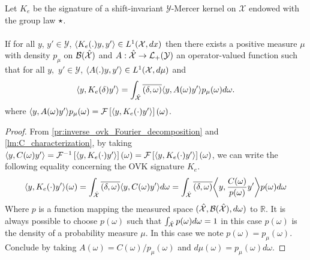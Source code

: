 \begin{proposition}
\label{pr:spectral}
Let $K_e$ be the signature of a shift-invariant $\mathcal{Y}$-Mercer kernel on $\mathcal{X}$ endowed with the group law $\star$.
\paragraph{}
If for all $y$, $y' \in\mathcal{Y}$, $\langle K_e(.)y,y'\rangle\in L^1(\mathcal{X},dx)$ then there exists a positive measure $\mu$ with density $p_{\mu}$ on $\mathcal{B}(\mathcal{\hat{\mathcal{X}}})$ and $A:\hat{\mathcal{X}}\to \mathcal{L}_+(\mathcal{Y})$ an operator-valued function such that for all $y,$ $y'\in\mathcal{Y}$, $\langle A(.)y,y'\rangle\in L^1(\mathcal{X},d\mu)$ and
\begin{dmath*}
\inner{y, K_e(\delta)y'}=\int_{\dual{\mathcal{X}}}\conj{\pairing{\delta, \omega}}\inner{y, A(\omega)y'}p_{\mu}(\omega)d\omega.
\end{dmath*}
where $\langle y, A(\omega)y'\rangle p_{\mu}(\omega) = \mathcal{F}\left[\langle y, K_e(\cdot)y'\rangle\right](\omega)$.
\end{proposition}
\begin{proof}
From \cref{pr:inverse_ovk_Fourier_decomposition} and \cref{lm:C_characterization}, by taking $\langle y,C(\omega)y'\rangle = \mathcal{F}^{-1}\left[\langle y, K_e(\cdot)y'\rangle\right](\omega)=\mathcal{F}\left[\langle y, K_e(\cdot)y'\rangle\right](\omega)$, we can write the following equality concerning the \acs{OVK} signature $K_e$. 
\begin{dmath*}
\inner{y, K_e(\cdot)y'}(\omega)=
\int_{\dual{\mathcal{X}}}\conj{\pairing{\delta, \omega}}\inner{y, C(\omega)y'}d\omega
=\int_{\dual{\mathcal{X}}}\conj{\pairing{\delta, \omega}}\inner*{y, \frac{C(\omega)}{p(\omega)}y'}p(\omega)d\omega
\end{dmath*}
Where $p$ is a function mapping the measured space $(\hat{\mathcal{X}}, \mathcal{B}(\hat{\mathcal{X}}), d\omega)$ to $\mathbb{R}$. It is always possible to choose $p(\omega)$ such that $\int_{\hat{\mathcal{X}}}p(\omega)d\omega=1$ in this case $p(\omega)$ is the density of a probability measure $\mu$. In this case we note $p(\omega)=p_{\mu}(\omega)$. Conclude by taking $A(\omega)=C(\omega)/p_\mu(\omega)$ and $d\mu(\omega)=p_\mu(\omega)d\omega$.
\end{proof}
